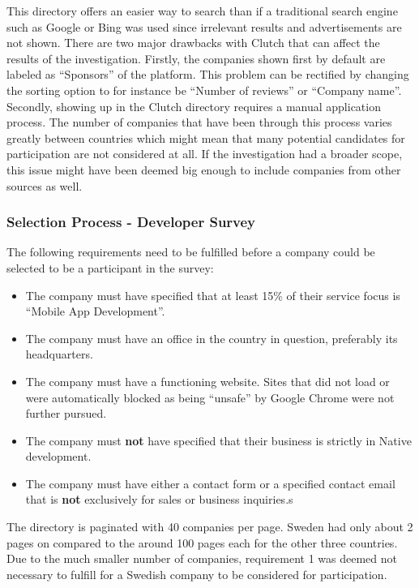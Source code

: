 \documentclass[a4paper,12pt]{article}
\begin{document}
This directory offers an easier way to search than if a traditional search engine such as Google or Bing was used since irrelevant results and advertisements are not shown. There are two major drawbacks with Clutch that can affect the results of the investigation. Firstly, the companies shown first by default are labeled as “Sponsors” of the platform. This problem can be rectified by changing the sorting option to for instance be “Number of reviews” or “Company name”. Secondly, showing up in the Clutch directory requires a manual application process. The number of companies that have been through this process varies greatly between countries which might mean that many potential candidates for participation are not considered at all. If the investigation had a broader scope, this issue might have been deemed big enough to include companies from other sources as well.

\subsubsection{Selection Process - Developer Survey}
\label{Project_participantSelection_processDevs}
The following requirements need to be fulfilled before a company could be selected to be a participant in the survey:

\begin{itemize}
    \item The company must have specified that at least 15\% of their service focus is “Mobile App Development”.
    \item The company must have an office in the country in question, preferably its headquarters.
    \item The company must have a functioning website. Sites that did not load or were automatically blocked as being “unsafe” by Google Chrome were not further pursued.
    \item The company must \textbf{not} have specified that their business is strictly in Native development.
    \item The company must have either a contact form or a specified contact email that is \textbf{not} exclusively for sales or business inquiries.s
\end{itemize}

The directory is paginated with 40 companies per page. Sweden had only about 2 pages on compared to the around 100 pages each for the other three countries. Due to the much smaller number of companies, requirement 1 was deemed not necessary to fulfill for a Swedish company to be considered for participation.
\end{document}
